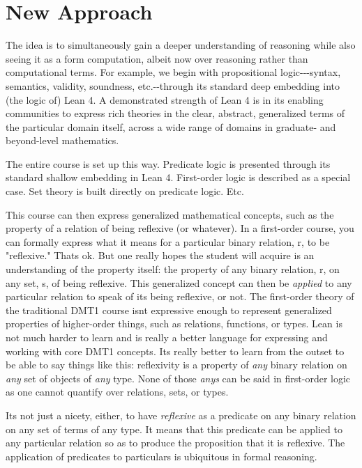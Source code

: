 \documentclass{book}
\begin{document}
\hypertarget{book__pandoc__debug__src__preface.md__new-approach}{%
\section*{New Approach}\label{book__pandoc__debug__src__preface.md__new-approach}}

The idea is to simultaneously gain a deeper understanding of reasoning while also
seeing it as a form computation, albeit now over reasoning rather than computational
terms. For example, we begin with propositional logic-\/-\/-syntax, semantics, validity,
soundness, etc.-\/-through its standard deep embedding into (the logic of) Lean 4. A
demonstrated strength of Lean 4 is in its enabling communities to express rich theories
in the clear, abstract, generalized terms of the particular domain itself, across a wide
range of domains in graduate- and beyond-level mathematics.

The entire course is set up this way. Predicate logic is presented through its standard
shallow embedding in Lean 4. First-order logic is described as a special case. Set theory
is built directly on predicate logic. Etc.

This course can then express generalized mathematical concepts, such as the property of
a relation of being reflexive (or whatever). In a first-order course, you can formally
express what it means for a particular binary relation, r, to be "reflexive." That\textquotesingle s ok.
But one really hopes the student will acquire is an understanding of the property itself:
the property of any binary relation, r, on any set, s, of being reflexive. This generalized
concept can then be \emph{applied} to any particular relation to speak of its being reflexive,
or not. The first-order theory of the traditional DMT1 course isn\textquotesingle t expressive enough to
represent generalized properties of higher-order things, such as relations, functions, or
types. Lean is not much harder to learn and is really a better language for expressing
and working with core DMT1 concepts. It\textquotesingle s really better to learn from the outset to be
able to say things like this: reflexivity is a property of \emph{any} binary relation on \emph{any}
set of objects of \emph{any} type. None of those \emph{anys} can be said in first-order logic as one
cannot quantify over relations, sets, or types.

It\textquotesingle s not just a nicety, either, to have \emph{reflexive} as a predicate on any binary
relation on any set of terms of any type. It means that this predicate can be applied
to any particular relation so as to produce the proposition that it is reflexive. The
application of predicates to particulars is ubiquitous in formal reasoning.
\end{document}
